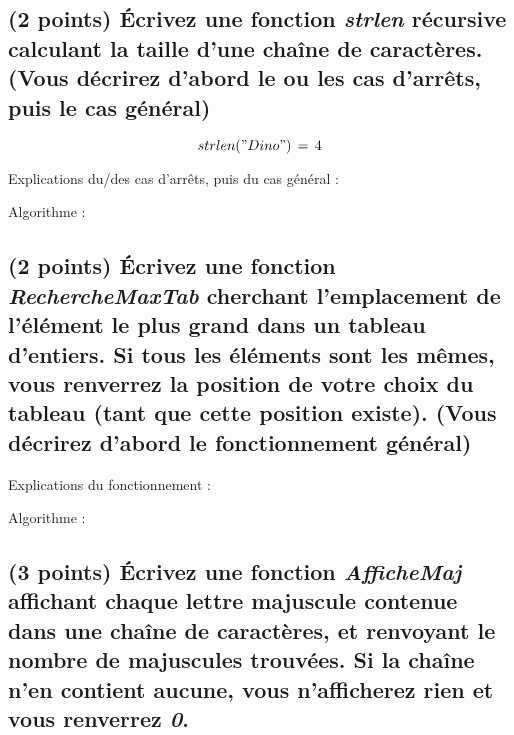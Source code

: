 \documentclass[11pt,a4paper]{article}
\begin{document}
\smallskip


\clearpage


\subsection{(2 points) \'Ecrivez une fonction \og \textit{strlen} \fg{} récursive calculant la taille d'une chaîne de caractères. (Vous décrirez d'abord le ou les cas d'arrêts, puis le cas général) }

\vspace*{-0.5cm}

\begin{center}

\begin{equation*}
strlen("Dino")  \, = \,  4
\end{equation*}

Explications du/des cas d'arrêts, puis du cas général :

\bigskip

Algorithme :

\bigskip

\end{center}

\smallskip


\clearpage


\subsection{(2 points) \'Ecrivez une fonction \og \textit{RechercheMaxTab} \fg{} cherchant l'emplacement de l'élément le plus grand dans un tableau d'entiers. Si tous les éléments sont les mêmes, vous renverrez la position de votre choix du tableau (tant que cette position existe). (Vous décrirez d'abord le fonctionnement général) }


\begin{center}
Explications du fonctionnement :

Algorithme :

\bigskip

\end{center}


\clearpage


\subsection{(3 points) \'Ecrivez une fonction \og \textit{AfficheMaj} \fg{} affichant chaque lettre majuscule contenue dans une chaîne de caractères, et renvoyant le nombre de majuscules trouvées. Si la chaîne n'en contient aucune, vous n'afficherez rien et vous renverrez \textit{0}. }
\end{document}
